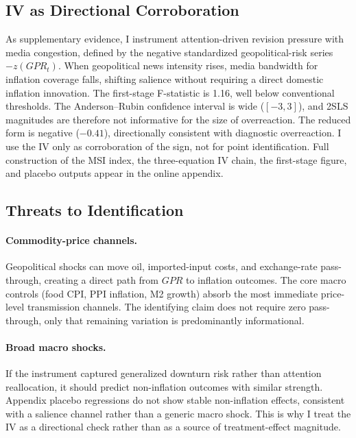 \subsection{IV as Directional Corroboration}

As supplementary evidence, I instrument attention-driven revision pressure
with media congestion, defined by the negative standardized
geopolitical-risk series $-z(GPR_t)$. When geopolitical news intensity
rises, media bandwidth for inflation coverage falls, shifting salience
without requiring a direct domestic inflation innovation. The first-stage
F-statistic is 1.16, well below conventional thresholds. The
Anderson--Rubin confidence interval is wide ($[-3,3]$), and 2SLS
magnitudes are therefore not informative for the size of overreaction. The
reduced form is negative ($-0.41$), directionally consistent with
diagnostic overreaction. I use the IV only as corroboration of the sign,
not for point identification. Full construction of the MSI index, the
three-equation IV chain, the first-stage figure, and placebo outputs
appear in the online appendix.

\subsection{Threats to Identification}

\paragraph{Commodity-price channels.}
Geopolitical shocks can move oil, imported-input costs, and exchange-rate
pass-through, creating a direct path from $GPR$ to inflation outcomes.
The core macro controls (food CPI, PPI inflation, M2 growth) absorb the
most immediate price-level transmission channels. The identifying claim
does not require zero pass-through, only that remaining variation is
predominantly informational.

\paragraph{Broad macro shocks.}
If the instrument captured generalized downturn risk rather than attention
reallocation, it should predict non-inflation outcomes with similar
strength. Appendix placebo regressions do not show stable non-inflation
effects, consistent with a salience channel rather than a generic macro
shock. This is why I treat the IV as a directional check rather than as a
source of treatment-effect magnitude.

